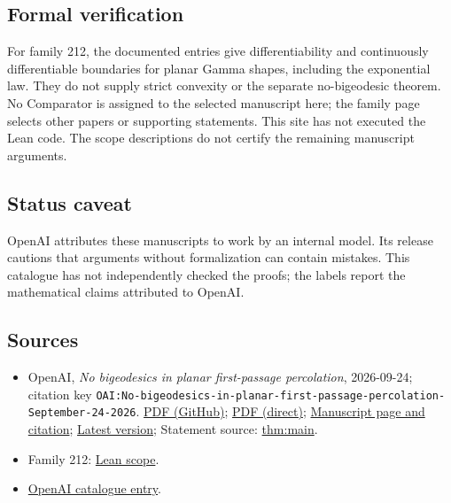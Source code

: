 \documentclass[11pt]{article}
\begin{document}
\subsection{Formal verification}
For family 212, the documented entries give differentiability and continuously differentiable boundaries for planar Gamma shapes, including the exponential law. They do not supply strict convexity or the separate no-bigeodesic theorem. No Comparator is assigned to the selected manuscript here; the family page selects other papers or supporting statements. This site has not executed the Lean code. The scope descriptions do not certify the remaining manuscript arguments.

\subsection{Status caveat}
OpenAI attributes these manuscripts to work by an internal model. Its release cautions that arguments without formalization can contain mistakes. This catalogue has not independently checked the proofs; the labels report the mathematical claims attributed to OpenAI.

\subsection{Sources}
\begin{itemize}
\item OpenAI, \emph{No bigeodesics in planar first-passage percolation}, 2026-09-24; citation key \texttt{OAI:No-bigeodesics-in-planar-first-passage-percolation-September-24-2026}. \href{https://github.com/openai/math/blob/adc7f1241b42e322a6451854ab7e4b4c146bf78a/preprints/No-bigeodesics-in-planar-first-passage-percolation-September-24-2026/main.pdf}{PDF (GitHub)}; \href{https://github.com/openai/math/raw/adc7f1241b42e322a6451854ab7e4b4c146bf78a/preprints/No-bigeodesics-in-planar-first-passage-percolation-September-24-2026/main.pdf}{PDF (direct)}; \href{https://github.com/openai/math/blob/adc7f1241b42e322a6451854ab7e4b4c146bf78a/preprints/No-bigeodesics-in-planar-first-passage-percolation-September-24-2026/README.md}{Manuscript page and citation}; \href{https://github.com/openai/math/blob/main/preprints/No-bigeodesics-in-planar-first-passage-percolation-September-24-2026/main.pdf}{Latest version}; Statement source: \href{https://github.com/openai/math/blob/adc7f1241b42e322a6451854ab7e4b4c146bf78a/preprints/No-bigeodesics-in-planar-first-passage-percolation-September-24-2026/build/sections/01-introduction.tex\#L24}{thm:main}.
\item Family 212: \href{https://github.com/openai/math/blob/adc7f1241b42e322a6451854ab7e4b4c146bf78a/lean/docs/212.md}{Lean scope}.
\item \href{https://github.com/openai/math/blob/adc7f1241b42e322a6451854ab7e4b4c146bf78a/CONTENTS.md}{OpenAI catalogue entry}.
\end{itemize}
\end{document}
